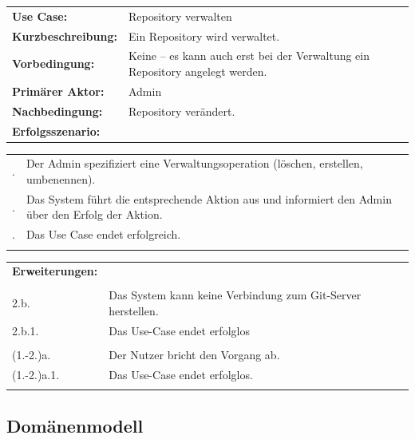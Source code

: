 \documentclass[a4paper]{article}
\begin{document}
\begin{tabularx}{\textwidth}{lX}
\textbf{Use Case:} & Repository verwalten\\
\textbf{Kurzbeschreibung:} & Ein Repository wird verwaltet.\\
\textbf{Vorbedingung:} & Keine – es kann auch erst bei der Verwaltung ein Repository angelegt werden.\\
\textbf{Primärer Aktor:}	 & Admin\\
\textbf{Nachbedingung:}	& Repository verändert.\\
\textbf{Erfolgsszenario:} & 
\end{tabularx}

\begin{tabularx}{\textwidth}{lX}
\\
\qquad 1. & Der Admin spezifiziert eine Verwaltungsoperation (löschen, erstellen, umbenennen). \\
\qquad 2. & Das System führt die entsprechende Aktion aus und informiert den Admin über den Erfolg der Aktion. \\
\qquad 3. & Das Use Case endet erfolgreich.\\\\\hline
\end{tabularx}

\begin{tabularx}{\textwidth}{lX}
\textbf{Erweiterungen:}\\\\
\qquad \qquad 2.b. & Das System kann keine Verbindung zum Git-Server herstellen.\\
\qquad \qquad 2.b.1. & Das Use-Case endet erfolglos\\\\
\qquad \qquad (1.-2.)a. & Der Nutzer bricht den Vorgang ab.\\
\qquad \qquad (1.-2.)a.1. & Das Use-Case endet erfolglos.\\\\
\end{tabularx}

\newpage	
\subsection{Domänenmodell}
\end{document}
